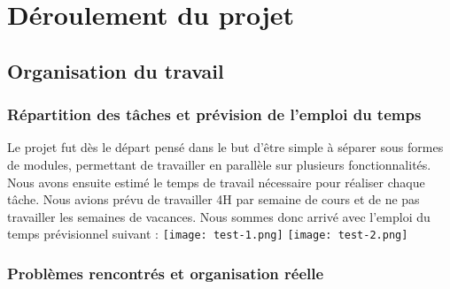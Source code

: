 \graphicspath{{Others/}}

\section{Déroulement du projet}
\subsection{Organisation du travail}
\subsubsection{Répartition des tâches et prévision de l'emploi du temps}
Le projet fut dès le départ pensé dans le but d'être simple à séparer sous formes de modules, permettant de travailler en parallèle sur plusieurs fonctionnalités.
Nous avons ensuite estimé le temps de travail nécessaire pour réaliser chaque tâche. 
Nous avions prévu de travailler 4H par semaine de cours et de ne pas travailler les semaines de vacances.
Nous sommes donc arrivé avec l'emploi du temps prévisionnel suivant :
\texttt{[image: test-1.png]}
\texttt{[image: test-2.png]}
\subsubsection{Problèmes rencontrés et organisation réelle}